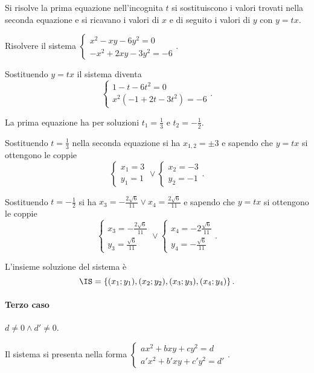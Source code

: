 Si risolve la prima equazione nell'incognita \(t\) si sostituiscono i valori 
trovati nella seconda equazione e si ricavano i valori di \(x\) e di seguito i 
valori di \(y\) con \(y={tx}\).

\newpage

\begin{esempio}{}{}
Risolvere il sistema \(\left\{\begin{array}{l}x^2-{xy}-6y^2=0 
\\-x^2+2{xy}-3y^2=-6 \end{array}\right.\).

Sostituendo \(y={tx}\) il sistema diventa 
\[\left\{\begin{array}{l}1-t-6t^2=0 \\x^2(-1+2t-3t^2)=-6 \end{array}\right..\]

La prima equazione ha per soluzioni \(t_1=\frac 1 3\) e \(t_2=-\frac 1 2\).

Sostituendo \(t=\frac 1 3\) nella seconda equazione si ha \(x_{1,2}=\pm 3\) e 
sapendo che \(y={tx}\) si ottengono le coppie 
\[\left\{\begin{array}{l}x_1=3\\y_1=1\end{array}\right.\vee\left\{\begin{array}{
l}x_2=-3\\y_2=-1\end{array}\right..\]

Sostituendo \(t=-\frac 1 2\) si ha \(x_3=-\frac{2\sqrt 6}{11}\vee 
x_4=\frac{2\sqrt 6}{11}\) e sapendo che \(y={tx}\) si ottengono le coppie 
\[\left\{\begin{array}{l}x_3=-\frac{2\sqrt 6}{11}\\y_3=\frac{\sqrt 
6}{11}\end{array}\right.\vee\left\{\begin{array}{l}x_4=-2\frac{\sqrt 
6}{11}\\y_4=-\frac{\sqrt 6}{11}\end{array}\right..\]

L'insieme soluzione del sistema è 
\[\IS=\left\{(x_1;y_1),(x_2;y_2),(x_3;y_3),(x_4;y_4)\right\}.\]
\end{esempio}


\paragraph{Terzo caso} \(d\neq 0 \wedge d'\neq 0\).

Il sistema si presenta nella forma 
\(\left\{
\begin{array}{l}{{ax}^2+{bxy}+{cy}^2=d}\\{a'x^2+b'{xy}+c'y^2=d'}\end{array}
\right.\).

